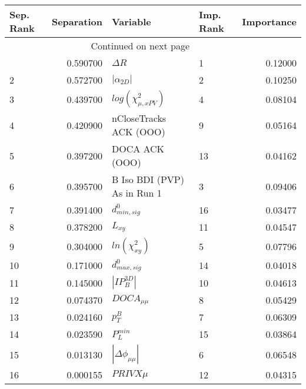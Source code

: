 \usepackage{lscape}

\begin{landscape}
\begin{longtable}{lrllr}
\toprule
Sep. Rank &  Separation &                     Variable & Imp. Rank &  Importance \\
\midrule
\endhead
\midrule
\multicolumn{3}{r}{{Continued on next page}} \\
\midrule
\endfoot

\bottomrule
\endlastfoot
        1 &    0.590700 &                   $\Delta R$ &         1 &     0.12000 \\
        2 &    0.572700 &              $|\alpha_{2D}|$ &         2 &     0.10250 \\
        3 &    0.439700 &    $log(\chi^{2}_{\mu,xPV})$ &         4 &     0.08104 \\
        4 &    0.420900 &       nCloseTracks ACK (OOO) &         9 &     0.05164 \\
        5 &    0.397200 &               DOCA ACK (OOO) &        13 &     0.04162 \\
        6 &    0.395700 &  B Iso BDI (PVP) As in Run 1 &         3 &     0.09406 \\
        7 &    0.391400 &             $d^0_{min, sig}$ &        16 &     0.03477 \\
        8 &    0.378200 &                     $L_{xy}$ &        11 &     0.04547 \\
        9 &    0.304000 &          $ln(\chi^{2}_{xy})$ &         5 &     0.07796 \\
       10 &    0.171000 &             $d^0_{max, sig}$ &        14 &     0.04018 \\
       11 &    0.145000 &              $|IP_{B}^{3D}|$ &        10 &     0.04613 \\
       12 &    0.074370 &              $DOCA_{\mu\mu}$ &         8 &     0.05429 \\
       13 &    0.024160 &                    $p^B_{T}$ &         7 &     0.06309 \\
       14 &    0.023590 &                $P^{min}_{L}$ &        15 &     0.03864 \\
       15 &    0.013130 &     $|\Delta \phi_{\mu\mu}|$ &         6 &     0.06548 \\
       16 &    0.000155 &                   $PRIVX\mu$ &        12 &     0.04315 \\
\end{longtable}

\end{landscape}
